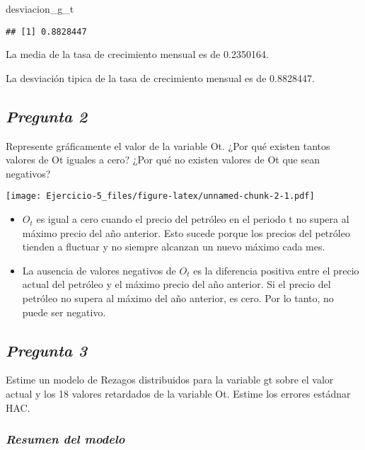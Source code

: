 \documentclass[
  12pt,
]{article}
\newenvironment{Shaded}{\begin{snugshade}}{\end{snugshade}}
\newcommand{\NormalTok}[1]{#1}
\begin{document}
\begin{Shaded}
\begin{Highlighting}[]
\NormalTok{desviacion\_g\_t}
\end{Highlighting}
\end{Shaded}

\begin{verbatim}
## [1] 0.8828447
\end{verbatim}

La media de la tasa de crecimiento mensual es de 0.2350164.

La desviación tipica de la tasa de crecimiento mensual es de 0.8828447.

\subsection{\texorpdfstring{\textbf{\emph{Pregunta
2}}}{Pregunta 2}}\label{pregunta-2}

Represente gráficamente el valor de la variable Ot. ¿Por qué existen
tantos valores de Ot iguales a cero? ¿Por qué no existen valores de Ot
que sean negativos?

\texttt{[image: Ejercicio-5\_files/figure-latex/unnamed-chunk-2-1.pdf]}

\begin{itemize}
\item
  \(O_t\) es igual a cero cuando el precio del petróleo en el periodo t
  no supera al máximo precio del año anterior. Esto sucede porque los
  precios del petróleo tienden a fluctuar y no siempre alcanzan un nuevo
  máximo cada mes.
\item
  La ausencia de valores negativos de \(O_t\) es la diferencia positiva
  entre el precio actual del petróleo y el máximo precio del año
  anterior. Si el precio del petróleo no supera al máximo del año
  anterior, es cero. Por lo tanto, no puede ser negativo.
\end{itemize}

\subsection{\texorpdfstring{\textbf{\emph{Pregunta
3}}}{Pregunta 3}}\label{pregunta-3}

Estime un modelo de Rezagos distribuidos para la variable gt sobre el
valor actual y los 18 valores retardados de la variable Ot. Estime los
errores estádnar HAC.

\subsubsection{\texorpdfstring{\textbf{\emph{Resumen del
modelo}}}{Resumen del modelo}}\label{resumen-del-modelo}
\end{document}
